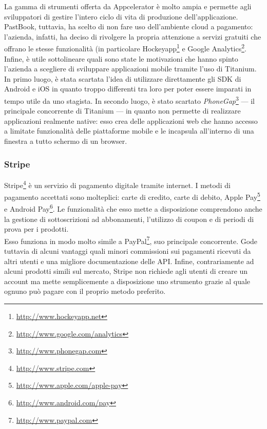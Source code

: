 				La gamma di strumenti offerta da Appcelerator è molto ampia e permette agli sviluppatori di gestire l'intero ciclo di
				vita di produzione dell'applicazione. PastBook, tuttavia, ha scelto di non fare uso dell'ambiente cloud a pagamento:
				l'azienda, infatti, ha deciso di rivolgere la propria attenzione a servizi gratuiti che offrano le stesse
				funzionalità (in particolare Hockeyapp\footnote{\url{http://www.hockeyapp.net}} e
				Google Analytics\footnote{\url{http://www.google.com/analytics}}.\\
				Infine, è utile sottolineare quali sono state le motivazioni che hanno spinto l'azienda a scegliere di sviluppare
				applicazioni mobile tramite l'uso di Titanium. In primo luogo, è stata scartata l'idea di utilizzare direttamente gli
				SDK di Android e iOS in quanto troppo differenti tra loro per poter essere imparati in tempo utile da uno stagista.
				In secondo luogo, è stato scartato \emph{PhoneGap}\footnote{\url{http://www.phonegap.com}} — il principale
				concorrente di Titanium — in quanto non permette di realizzare applicazioni realmente native: esso crea delle
				applicazioni web che hanno accesso a limitate funzionalità delle piattaforme mobile e le incapsula all'interno di una
				finestra a tutto schermo di un browser.
			\subsubsection{Stripe}
				Stripe\footnote{\url{http://www.stripe.com}} è un servizio di pagamento digitale tramite internet. I metodi di
				pagamento accettati sono molteplici: carte di credito, carte di debito,
				Apple Pay\footnote{\url{http://www.apple.com/apple-pay}} e Android Pay\footnote{\url{http://www.android.com/pay}}. Le
				funzionalità che esso mette a disposizione comprendono anche la gestione di sottoscrizioni ad abbonamenti,
				l'utilizzo di coupon e di periodi di prova per i prodotti.\\
				Esso funziona in modo molto simile a PayPal\footnote{\url{http://www.paypal.com}}, suo principale concorrente.
				Gode tuttavia di alcuni vantaggi quali minori commissioni sui pagamenti ricevuti da altri utenti e una migliore
				documentazione delle API. Infine, contrariamente ad alcuni prodotti simili sul mercato, Stripe non richiede agli
				utenti di creare un account ma mette semplicemente a disposizione uno strumento grazie al quale ognuno può pagare
				con il proprio metodo preferito.
